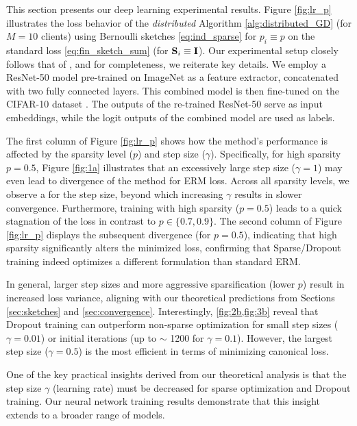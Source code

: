 \documentclass{article}
\newcommand{\mI}{\mathbf{I}}
\theoremstyle{plain}
\newcommand{\mS}{{\bf S}}
\theoremstyle{plain}
\theoremstyle{definition}
\theoremstyle{remark}
\begin{document}
This section presents our deep learning experimental results. Figure \ref{fig:lr_p} illustrates the loss behavior of the \emph{distributed} Algorithm \ref{alg:distributed_GD} (for $M=10$ clients) using Bernoulli sketches \eqref{eq:ind_sparse} for $p_i \equiv p$ on the standard loss \eqref{eq:fin_sketch_sum} (for $\mS_i \equiv \mI$).
Our experimental setup closely follows that of \citet{liao2022on}, and for completeness, we reiterate key details.
We employ a ResNet-50 model \citep{he2016deep} pre-trained on ImageNet as a feature extractor, concatenated with two fully connected layers. This combined model is then fine-tuned on the CIFAR-10 dataset \citep{krizhevsky2009cifar}. The outputs of the re-trained ResNet-50 serve as input embeddings,
while the logit outputs of the combined model are used as labels.



The first column of Figure \ref{fig:lr_p} shows how the method’s performance is affected by the sparsity level ($p$) and step size ($\gamma$). Specifically, for high sparsity $p=0.5$, Figure \ref{fig:1a} illustrates that an excessively large step size ($\gamma=1$) may even lead to divergence of the method for ERM loss. Across all sparsity levels, we observe a  for the step size, beyond which increasing $\gamma$ results in slower convergence. Furthermore, training with high sparsity ($p=0.5$) leads to a quick stagnation of the loss in contrast to $p \in\{0.7, 0.9\}$. The second column of Figure \ref{fig:lr_p} displays the subsequent divergence (for $p=0.5$), indicating that high sparsity significantly alters the minimized loss, confirming that Sparse/Dropout training indeed optimizes a different formulation than standard ERM.

In general, larger step sizes and more aggressive sparsification (lower $p$) result in increased loss variance, aligning with our theoretical predictions from Sections \ref{sec:sketches} and \ref{sec:convergence}.
Interestingly, \cref{fig:2b,fig:3b}
reveal that Dropout training can outperform non-sparse optimization for small step sizes ($\gamma=0.01$) or initial iterations (up to $\sim$ 1200 for $\gamma=0.1$). However, the largest step size ($\gamma=0.5$) is the most efficient in terms of minimizing canonical loss.

One of the key practical insights derived from our theoretical analysis is that the step size $\gamma$ (learning rate) must be decreased for sparse optimization and Dropout training. Our neural network training results demonstrate that this insight extends to a broader range of models.
\end{document}
